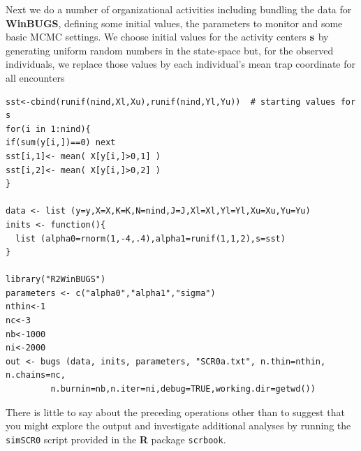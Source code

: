 Next we do a number of organizational activities including bundling
the data for {\bf WinBUGS}, defining some initial values, the parameters to
monitor and some basic MCMC settings.  We choose initial values for
the activity centers ${\bf s}$ by generating uniform random numbers in
the state-space but, for the observed individuals, we replace those
values by each individual's mean trap coordinate for all encounters
{\small
\begin{verbatim}
sst<-cbind(runif(nind,Xl,Xu),runif(nind,Yl,Yu))  # starting values for s
for(i in 1:nind){
if(sum(y[i,])==0) next
sst[i,1]<- mean( X[y[i,]>0,1] )
sst[i,2]<- mean( X[y[i,]>0,2] )
}

data <- list (y=y,X=X,K=K,N=nind,J=J,Xl=Xl,Yl=Yl,Xu=Xu,Yu=Yu)
inits <- function(){
  list (alpha0=rnorm(1,-4,.4),alpha1=runif(1,1,2),s=sst)
}

library("R2WinBUGS")
parameters <- c("alpha0","alpha1","sigma")
nthin<-1
nc<-3
nb<-1000
ni<-2000
out <- bugs (data, inits, parameters, "SCR0a.txt", n.thin=nthin, n.chains=nc, 
         n.burnin=nb,n.iter=ni,debug=TRUE,working.dir=getwd())
\end{verbatim}
} 
There is little to say about the preceding operations other than to
suggest that you might explore the output and investigate additional
analyses by running the \mbox{\tt simSCR0} script provided in the
{\bf R} package \mbox{\tt scrbook}.

